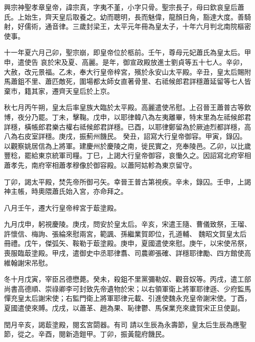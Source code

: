 
\begin{pinyinscope}

 興宗神聖孝章皇帝，諱宗真，字夷不堇，小字只骨。聖宗長子，母曰欽哀皇后蕭氏。上始生，齊天皇后取養之。幼而聰明，長而魅偉，龍顏日角，豁達大度。善騎射，好儒術，通音律。三歲封梁王，太平元年冊為皇太子，十年六月判北南院樞密使事。



 十一年夏六月己卯，聖宗崩，即皇帝位於柩前。壬午，尊母元妃蕭氏為皇太后。甲申，遣使告
 哀於宋及夏、高麗。是年，御宣政殿放進士劉貞等五十七人。辛卯，大赦，改元景福。乙未，奉大行皇帝梓宮，殯於永安山太平殿。辛丑，皇太后賜附馬蕭鉏不里、蕭匹敵死，圍場都太師女直著骨里、右祗候郎君詳穩蕭延留等七人皆棄市，籍其家，遷齊天皇后於上京。



 秋七月丙午朔，皇太后率皇族大臨於太平殿。高麗遣使吊慰。上召晉王蕭普古等飲博，夜分乃罷。丁未，擊鞠。戊申，以耶律韓八為左夷離畢，特末里為左祗候郎君詳穩，橫帳郎君樂古權右祗候郎君詳穩。已酉，以耶律鄭留為於厥迪烈都詳穩，高八為右皮室詳穩。庚戌，振薊州饑民。
 癸丑，詔寫大行皇帝御容。甲寅，錄囚。以觀察姚居信為上將軍。建慶州於慶陵之南，徙民實之，充奉陵邑。乙卯，以比歲豐稔，罷給東京統軍司糧。丁巳，上謁大行皇帝御容，哀慟久之。因詔寫北府宰相蕭孝先，南府宰相蕭孝穆像於御容殿。以蕭阿姑軫為東京留守。



 丁卯，謁太平殿，焚先帝所御弓矢。幸晉王普古第視疾。辛未，錄囚。壬申，上謁神主帳，時奧隈蕭氏始入宮，亦命拜之。



 八月壬午，遷大行皇帝梓宮于菆塗殿。



 九月戊申，躬視慶陵。庚戌，問安於皇太后。辛亥，宋遣王隨、曹儀致祭，王瑠、許懷信、梅詢、張綸來慰兩宮，範諷、孫繼業賀即位，孔道輔、
 魏昭文賀皇太后冊禮。戊午，傑弧矢、鞍勒于菆塗殿。庚申，夏國遣使來慰。庚午，以宋使吊祭，喪服臨菆塗殿。甲戌，遣御史中丞耶律翥、司農卿張確、詳穩耶律勵、四方館使高維翰謝宋吊慰。



 冬十月戊寅，宰臣呂德懋薨。癸未，殺鉏不里黨彌勒奴、觀音奴等。丙戌，遣工部尚書高德順、崇祿卿李可封致先帝遺物於宋；以右領軍衛上將軍耶律遜、少府監馬憚充皇太后謝宋使；右監門衛上將軍耶律元載、引進使魏永充皇帝謝宋使。丁酉，夏國遣使來賻。戊戌，以蕭革、趙為果、恥律鬱、馬保業充來歲賀宋正旦使副。



 閏月辛亥，謁菆塗殿，閱玄宮閟器。有司
 請以生辰為永壽節，皇太后生辰為應聖節，從之。辛酉，閱新造鎧甲。丁卯，振黃龍府饑民。




\end{pinyinscope}

